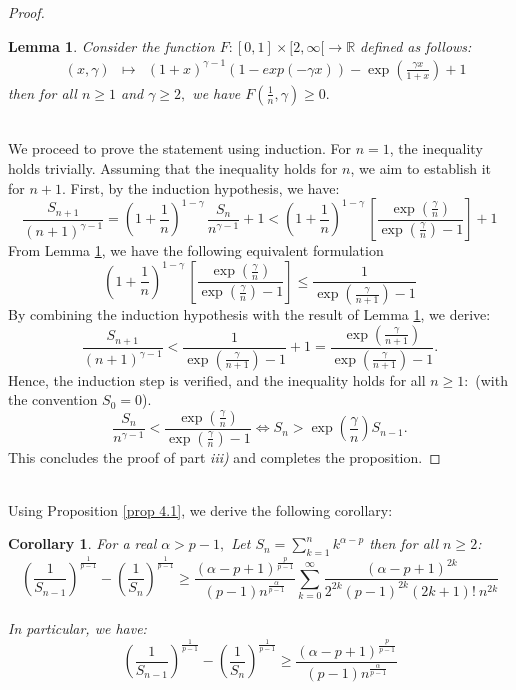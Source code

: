 \documentclass[11pt]{amsart}
\newtheorem{lem}[thm]{Lemma}
\newtheorem{cor}[thm]{Corollary}
\newcommand{\R}{\mathbb{R}}
\newcommand{\1}{[1]}
\begin{document}
\begin{proof}
\begin{lem} \label{lemma 4.2} Consider the function 
$F : [0,1]\times[2,\infty[ \longrightarrow  \R$ defined as follows:
$$\begin{array}{lrcl}
     &(x,\gamma) & \longmapsto & (1+x)^{\gamma-1} (1-exp(-\gamma x) ) - \exp \left( \frac{\gamma x}{1+x} \right) +1 \end{array}
$$
then for all $n \geq 1$ and $\gamma \geq 2,$ we have $F(\frac{1}{n} ,\gamma) \geq 0.$
\end{lem}
\phantom{.} \\
We proceed to prove the statement using induction.
For \( n = 1 \), the inequality holds trivially. Assuming that the inequality holds for \( n \), we aim to establish it for \( n + 1 \). First, by the induction hypothesis, we have:
$$ \frac{S_{n+1}} {(n+1)^{\gamma-1}} = ( 1+ \frac{1}{n})^{1-\gamma} \,  \frac{S_{n}}{n^{\gamma-1}} +1 <
( 1+ \frac{1}{n})^{1-\gamma} \, \left[ \frac{\exp(\frac{\gamma}{n})}{\exp(\frac{\gamma}{n})-1} \right] + 1$$
From Lemma \ref{lemma 4.2}, we have the following equivalent formulation
$$( 1+ \frac{1}{n})^{1-\gamma}  \, \left[ \frac{\exp(\frac{\gamma}{n})}{\exp(\frac{\gamma}{n})-1} \right]  \leq \frac{1}{\exp(\frac{\gamma}{n+1})-1}$$
By combining the induction hypothesis with the result of Lemma \ref{lemma 4.2}, we derive:
$$\frac{S_{n+1}} {(n+1)^{\gamma-1}}
<   \frac{1}{\exp(\frac{\gamma}{n+1})-1} +1  =  \frac{\exp(\frac{\gamma}{n+1})}{\exp(\frac{\gamma}{n+1})-1}.$$ Hence, the induction step is verified, and the inequality holds for all $n \geq 1:$ (with the convention $S_{0}=0$).
$$ \frac{S_n}{n^{\gamma-1}} < \frac{\exp(\frac{\gamma}{n})}{\exp(\frac{\gamma}{n})-1} \Leftrightarrow S_{n} > \exp(\frac{\gamma}{n}) S_{n-1}.
$$
This concludes the proof of part \textit{iii)} and completes the proposition.
\end{proof}
\phantom{.} \\
Using Proposition \ref{prop 4.1}, we derive the following corollary:
\begin{cor} \label{cor 4.3} For a real $\alpha > p-1,$ Let $\displaystyle S_{n} = \sum_{k=1}^{n} k^{\alpha-p}$ then for all $n\geq 2$:
$$ \left( \frac{1}{S_{n-1}} \right)^{\frac{1}{p-1}}- \left( \frac{1}{S_{n}} \right)^{\frac{1}{p-1}} \geq \frac{(\alpha-p+1)^{\frac{p}{p-1}}}{(p-1) n^{\frac{\alpha}{p-1}}} 
\sum_{k=0}^{\infty} \frac{(\alpha-p+1)^{2k}}{2^{2k}(p-1)^{2k} (2k+1)!  \ n^{2k}} $$ \\
In particular, we have:
$$
 \left( \frac{1}{S_{n-1}} \right)^{\frac{1}{p-1}}- \left( \frac{1}{S_{n}} \right)^{\frac{1}{p-1}} \geq  \frac{(\alpha-p+1)^{\frac{p}{p-1}}}{(p-1) n^{\frac{\alpha}{p-1}}} 
$$
\end{cor}
\end{document}
